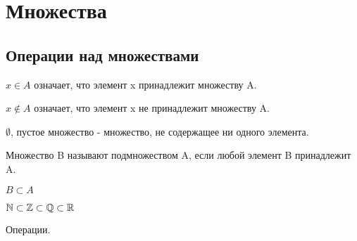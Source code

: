 



\chapter{Множества}


\section{Операции над множествами}






\begin{notation}
    $x \in A$ означает, что элемент x принадлежит множеству A.
\end{notation}

$x \notin A$ означает, что элемент x не принадлежит множеству A.
    
\begin{definition}
    $\emptyset$, пустое множество - множество, не содержащее ни одного элемента.
\end{definition}



\begin{definition}
    Множество B называют подмножеством A, если любой элемент B принадлежит A.

    \begin{notation}
        $B \subset A$
    \end{notation}

    \begin{eg}
        $\mathbb{N} \subset \mathbb{Z} \subset \mathbb{Q} \subset \mathbb{R}$
    \end{eg}
\end{definition}

Операции.

